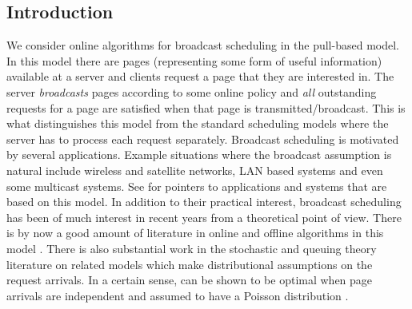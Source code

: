 \documentclass[11pt]{article}
\begin{document}
\begin{titlepage}
\section{Introduction}
We consider online algorithms for broadcast scheduling in the
pull-based model. In this model there are  pages (representing some
form of useful information) available at a server and clients request
a page that they are interested in. The server {\em broadcasts} pages
according to some online policy and {\em all} outstanding requests for
a page are satisfied when that page is transmitted/broadcast. This is
what distinguishes this model from the standard scheduling models
where the server has to process each request separately. Broadcast
scheduling is motivated by several applications. Example situations
where the broadcast assumption is natural include wireless and
satellite networks, LAN based systems and even some multicast
systems. See \cite{Wong88,AcharyaFZ95,AksoyF98,Hall03} for pointers to
applications and systems that are based on this model. In addition to
their practical interest, broadcast scheduling has been of much
interest in recent years from a theoretical point of view. There is by
now a good amount of literature in online and offline algorithms in
this model \cite{BarnoyBNS98,AksoyF98,AcharyaFZ95,BartalM00,Hall03}. There is
also substantial work in the stochastic and queuing theory literature
\cite{DebS73,Deb84,Weiss79,WeissP81} on related models which make
distributional assumptions on the request arrivals. In a certain
sense,  can be shown to be optimal when page arrivals are
independent and assumed to have a Poisson distribution
\cite{AmmarW85}.




\end{titlepage}
\end{document}
